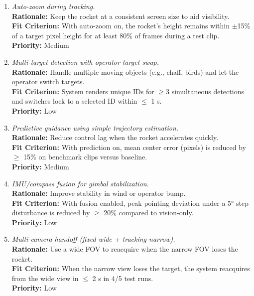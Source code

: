 \documentclass[12pt]{article}
\begin{document}
\begin{enumerate}[label=WTRM \arabic*., wide=0pt, leftmargin=*]

  \item \emph{Auto-zoom during tracking.}\\[2mm]
        \textbf{Rationale:} Keep the rocket at a consistent screen size to aid visibility.\\
        \textbf{Fit Criterion:} With auto-zoom on, the rocket’s height remains within $\pm$15\% of a target pixel height for at least 80\% of frames during a test clip.\\
        \textbf{Priority:} Medium

  \item \emph{Multi-target detection with operator target swap.}\\[2mm]
        \textbf{Rationale:} Handle multiple moving objects (e.g., chaff, birds) and let the operator switch targets.\\
        \textbf{Fit Criterion:} System renders unique IDs for $\geq$3 simultaneous detections and switches lock to a selected ID within $\leq$ 1 s.\\
        \textbf{Priority:} Low

  \item \emph{Predictive guidance using simple trajectory estimation.}\\[2mm]
        \textbf{Rationale:} Reduce control lag when the rocket accelerates quickly.\\
        \textbf{Fit Criterion:} With prediction on, mean center error (pixels) is reduced by $\geq$ 15\% on benchmark clips versus baseline.\\
        \textbf{Priority:} Medium

  \item \emph{IMU/compass fusion for gimbal stabilization.}\\[2mm]
        \textbf{Rationale:} Improve stability in wind or operator bump.\\
        \textbf{Fit Criterion:} With fusion enabled, peak pointing deviation under a 5° step disturbance is reduced by $\geq$ 20\% compared to vision-only.\\
        \textbf{Priority:} Low

  \item \emph{Multi-camera handoff (fixed wide + tracking narrow).}\\[2mm]
        \textbf{Rationale:} Use a wide FOV to reacquire when the narrow FOV loses the rocket.\\
        \textbf{Fit Criterion:} When the narrow view loses the target, the system reacquires from the wide view in $\leq$ 2 s in 4/5 test runs.\\
        \textbf{Priority:} Low


\end{enumerate}
\end{document}
